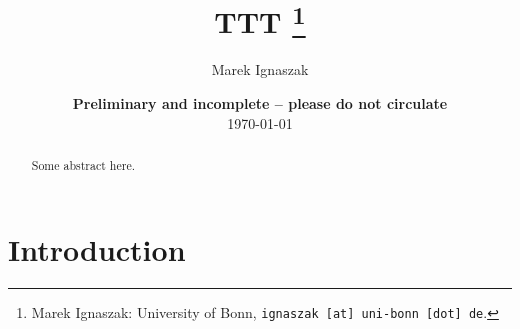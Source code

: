 \documentclass[11pt, a4paper, fleqn]{article}
\begin{document}
\title{TTT
\thanks{Marek Ignaszak: University of Bonn, {\nolinkurl{ignaszak [at] uni-bonn [dot] de}}.
}
}

\author{Marek Ignaszak
}

\date{
{\bf Preliminary and incomplete -- please do not circulate}
\\[1ex]
\today
}

\maketitle


\begin{abstract}
	Some abstract here.
\end{abstract}
\clearpage

\section{Introduction} %
\label{sec:introduction}



\printbibliography
{}
\end{document}
